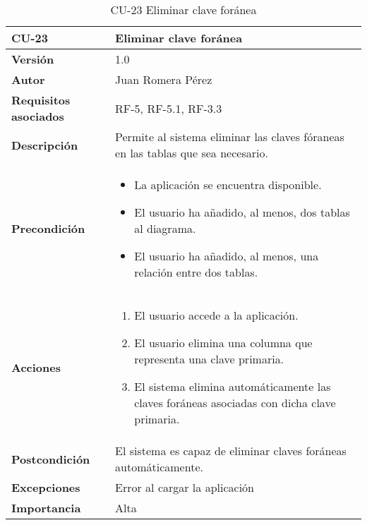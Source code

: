 \begin{table}[p]
    \centering
    \begin{tabularx}{\linewidth}{ p{} p{}}
		\toprule
		\textbf{CU-23}    & \textbf{Eliminar clave foránea}\\
		\toprule
		\textbf{Versión}              & 1.0    \\
		\textbf{Autor}                & Juan Romera Pérez \\
		\textbf{Requisitos asociados} & RF-5, RF-5.1, RF-3.3 \\
		\textbf{Descripción}          & Permite al sistema eliminar las claves fóraneas en las tablas que sea necesario. \\
		\textbf{Precondición}         & \begin{itemize}
		    \item La aplicación se encuentra disponible.
            \item El usuario ha añadido, al menos, dos tablas al diagrama.
            \item El usuario ha añadido, al menos, una relación entre dos tablas.
		\end{itemize} \\
		\textbf{Acciones}             &
		\begin{enumerate}
			\def\labelenumi{\arabic{enumi}.}
			\tightlist
			\item El usuario accede a la aplicación.
            \item El usuario elimina una columna que representa una clave primaria.
            \item El sistema elimina automáticamente las claves foráneas asociadas con dicha clave primaria.
		\end{enumerate}\\
		\textbf{Postcondición}        & El sistema es capaz de eliminar claves foráneas automáticamente. \\
		\textbf{Excepciones}          & Error al cargar la aplicación \\
		\textbf{Importancia}          & Alta \\
		\bottomrule
    \end{tabularx}
    \caption{CU-23 Eliminar clave foránea}
\end{table}

